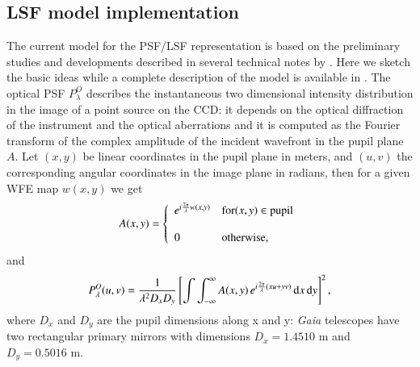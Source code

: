 \documentclass{aa}
\newcommand{\gaia}{\textit{Gaia}\xspace}
\begin{document}
\begin{appendix}
\section{LSF model implementation}\label{sec:lsfDetailed}

The current model for the PSF/LSF representation is based on the preliminary studies and developments described in several technical notes by \citet{LL:LL-068,LL:LL-084,LL:LL-089}. Here we sketch the basic ideas while a complete description of the model is available in \citet{LL:PMN-012}.
The optical PSF $P^O_\lambda$ describes the instantaneous two dimensional intensity distribution in the image of a point source on the CCD: it depends on the optical diffraction of the instrument and the optical aberrations and it is computed as the Fourier transform of the complex amplitude of the incident wavefront in the pupil plane $A$.
Let  $(x, y)$ be linear coordinates in the pupil plane in meters, and $(u, v)$ the corresponding angular coordinates in the image plane in radians, then for a given WFE map $w(x, y)$ we get 
\begin{equation}
A(x, y) = \left\{
\begin{array}{l@{\quad}l}
e^{i\frac{2\pi}{\lambda} w(x, y)} & {\rm for} (x, y) \in {\rm pupil}\\~\\
0                & {\rm otherwise,} 
\end{array}\right.
\end{equation}
and 
\begin{equation}
    P^O_\lambda(u, v) = \frac{1}{\lambda^2 D_x D_y} \left[ \int \int_{-\infty}^{\infty} A(x,y) \,e^{i \frac{2 \pi}{\lambda}(xu + yv)}  \, {\rm d}x \, {\rm d}y\right]^2
    \label{eq:opsf}
,\end{equation}
where $D_x$ and $D_y$ are the pupil dimensions along x and y: \gaia telescopes have two rectangular primary mirrors with dimensions $D_x=1.4510$ m and $D_y = 0.5016$ m.


\end{appendix}
\end{document}
